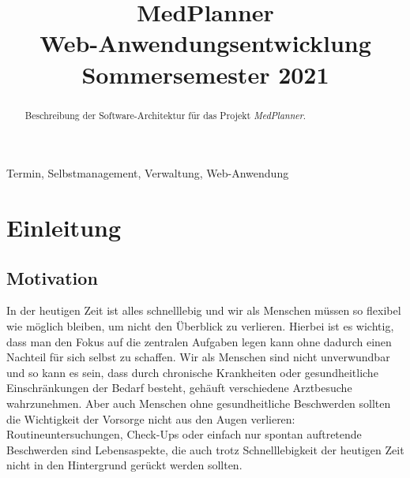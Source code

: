\documentclass[conference]{IEEEtran}
\begin{document}
\title{MedPlanner\\
{\large Web-Anwendungsentwicklung Sommersemester 2021}
}

\author{
\and
{}
\and
{}
\and
{}
\and
{}
}

\maketitle

\begin{abstract}
Beschreibung der Software-Architektur für das Projekt \textit{MedPlanner}.
\end{abstract}

\begin{IEEEkeywords}
Termin, Selbstmanagement, Verwaltung, Web-Anwendung
\end{IEEEkeywords}

\section{Einleitung}
\subsection{Motivation}
In der heutigen Zeit ist alles schnelllebig und wir als Menschen müssen so flexibel wie möglich bleiben, um nicht den Überblick zu verlieren. 
Hierbei ist es wichtig, dass man den Fokus auf die zentralen Aufgaben legen kann ohne dadurch einen Nachteil für sich selbst zu schaffen.
Wir als Menschen sind nicht unverwundbar und so kann es sein, dass durch chronische Krankheiten oder gesundheitliche Einschränkungen der Bedarf besteht, gehäuft verschiedene Arztbesuche wahrzunehmen.
Aber auch Menschen ohne gesundheitliche Beschwerden sollten die Wichtigkeit der Vorsorge nicht aus den Augen verlieren:
Routineuntersuchungen, Check-Ups oder einfach nur spontan auftretende Beschwerden sind Lebensaspekte, die auch trotz Schnelllebigkeit der heutigen Zeit nicht in den Hintergrund gerückt werden sollten.
\end{document}
